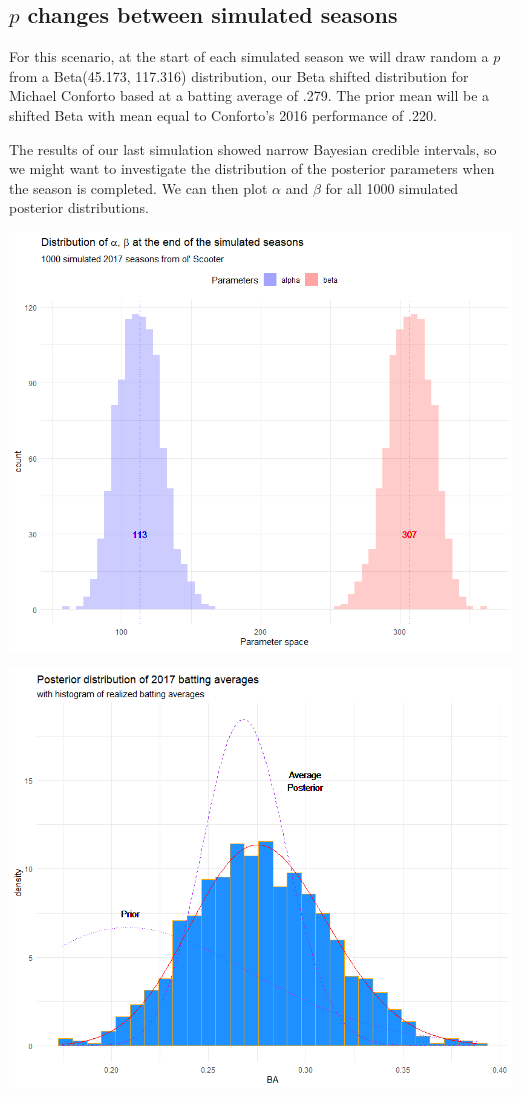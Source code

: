 \documentclass[10pt,a4paper]{article}
\begin{document}
\subsection{$p$ changes between simulated seasons}
For this scenario, at the start of each simulated season we will draw random a $p$ from a Beta(45.173, 117.316) distribution, our Beta shifted distribution for Michael Conforto based at a batting average of .279.
The prior mean will be a shifted Beta with mean equal to Conforto's 2016 performance of .220.

The results of our last simulation showed narrow Bayesian credible intervals, so we might want to investigate the distribution of the posterior parameters when the season is completed.
We can then plot $\alpha$ and $\beta$ for all 1000 simulated posterior distributions.

\begin{minipage}{.5\textwidth}
	\includegraphics[width=.8\textwidth]{posts_2017}
\end{minipage}
\begin{minipage}{.5\textwidth}
	\includegraphics[width=.8\textwidth]{dists_2017}
\end{minipage}
\end{document}
